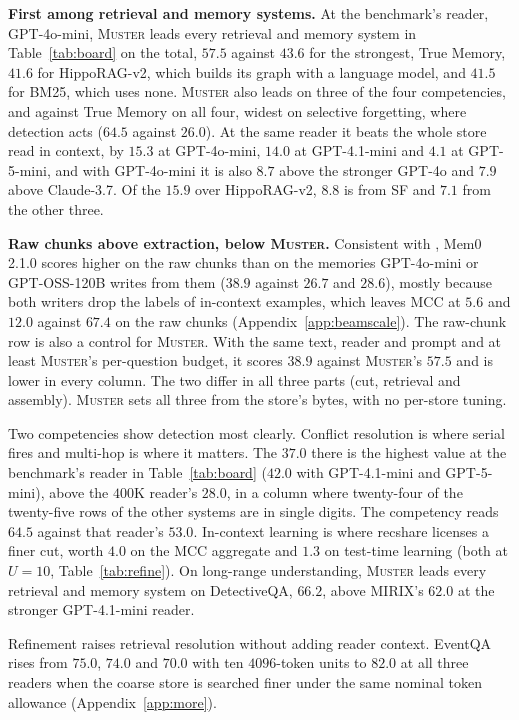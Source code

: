 \documentclass{article}
\newcommand{\sys}{\textsc{Muster}}
\newcommand{\serial}{\textsf{serial}}
\newcommand{\cov}{\textsf{recshare}}
\begin{document}
\textbf{First among retrieval and memory systems.} At the benchmark's reader, GPT-4o-mini, \sys{} leads every retrieval and memory system in
Table~\ref{tab:board} on the total, $57.5$ against $43.6$ for the strongest, True Memory, $41.6$ for HippoRAG-v2, which builds its graph with a language model, and $41.5$ for BM25, which uses none. \sys{} also leads on three of the four competencies, and against True Memory on all four, widest on selective forgetting, where detection acts ($64.5$ against $26.0$). At the
same reader it beats the whole store read in context, by $15.3$ at GPT-4o-mini, $14.0$ at GPT-4.1-mini and
$4.1$ at GPT-5-mini, and with GPT-4o-mini it is also $8.7$ above the stronger GPT-4o and $7.9$ above Claude-3.7. Of the $15.9$ over HippoRAG-v2, $8.8$ is from SF and $7.1$ from the other three.

\textbf{Raw chunks above extraction, below \sys{}.} Consistent with \cite{fidelity}, Mem0 2.1.0 scores higher on the raw chunks than on the memories GPT-4o-mini or GPT-OSS-120B writes from them ($38.9$ against $26.7$ and $28.6$), mostly because both writers drop the labels of in-context examples, which leaves MCC at $5.6$ and $12.0$ against $67.4$ on the raw chunks (Appendix~\ref{app:beamscale}). The raw-chunk row is also a control for \sys{}. With the same text, reader and prompt and at least \sys{}'s per-question budget, it scores $38.9$ against \sys{}'s $57.5$ and is lower in every column. The two differ in all three parts (cut, retrieval and assembly). \sys{} sets all three from the store's bytes, with no per-store tuning.

Two competencies show detection most clearly. Conflict resolution is where \serial{} fires and
multi-hop is where it matters. The $37.0$ there is the highest value at the benchmark's reader in Table~\ref{tab:board} ($42.0$ with GPT-4.1-mini and GPT-5-mini), above the
$400$K reader's $28.0$, in a column where twenty-four of the twenty-five rows of the other systems are in single digits.
The competency reads $64.5$ against that reader's $53.0$.
In-context learning is where \cov{} licenses a finer cut, worth $4.0$ on the MCC aggregate and $1.3$ on test-time learning (both at $U=10$, Table~\ref{tab:refine}). On long-range understanding, \sys{} leads every retrieval and memory system on DetectiveQA, $66.2$, above MIRIX's $62.0$ at the stronger GPT-4.1-mini reader.

Refinement raises retrieval resolution without adding reader context. EventQA rises from $75.0$, $74.0$ and $70.0$ with ten $4096$-token units to $82.0$ at all three readers when the coarse store is searched finer under the same nominal token allowance (Appendix~\ref{app:more}).
\end{document}
